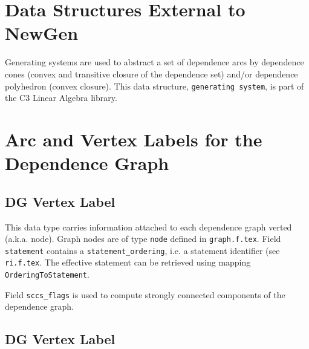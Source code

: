 {}

\section{Data Structures External to NewGen}
\label{section-data-structures-external-to-newgen}

Generating systems are used to abstract a set of dependence arcs by
dependence cones (convex and transitive closure of the dependence set)
and/or dependence polyhedron (convex closure). This data structure,
\verb/generating system/, is
part of the C3 Linear Algebra library.


\section{Arc and Vertex Labels for the Dependence Graph}
\label{section-arc-and-vertex-lables-for-the-dependence-graph}

\subsection{DG Vertex Label}

{}

This data type carries information attached to each dependence graph
verted (a.k.a. node). Graph nodes are of type \verb/node/ defined in
{\tt graph.f.tex}.  Field \verb/statement/ contains a
\verb/statement_ordering/, i.e. a statement identifier (see {\tt
ri.f.tex}. The effective statement can be retrieved using mapping
\verb/OrderingToStatement/.

Field \verb/sccs_flags/ is used to compute strongly connected components
of the dependence graph.

\begin{comment}
Ce domaine est utilise' pour contenir les informations qui sont
attache'es a` chaque noeud du graphe de de'pendances (voir le domaine
{\tt graph} dans le fichier {\tt graph.f.tex}). Le sous-domaine {\tt
statement} permet de retrouver l'instruction qui porte la de'pendance;
cet entier est le champ {\tt ordering} de l'instruction concerne'e. Le
sous-domaine {\tt sccflags} contient diverses informations utiles pour
le calcul des composantes fortement connexes.
\end{comment}

\subsection{DG Vertex Label}

